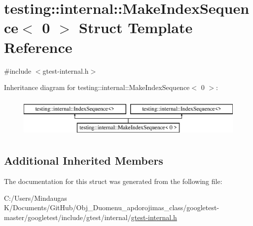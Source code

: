 \hypertarget{structtesting_1_1internal_1_1_make_index_sequence_3_010_01_4}{}\section{testing\+::internal\+::Make\+Index\+Sequence$<$ 0 $>$ Struct Template Reference}
\label{structtesting_1_1internal_1_1_make_index_sequence_3_010_01_4}


{\ttfamily \#include $<$gtest-\/internal.\+h$>$}

Inheritance diagram for testing\+::internal\+::Make\+Index\+Sequence$<$ 0 $>$\+:\begin{figure}[H]
\begin{center}
\leavevmode
\includegraphics[height=2.000000cm]{db/dac/structtesting_1_1internal_1_1_make_index_sequence_3_010_01_4}
\end{center}
\end{figure}
\subsection*{Additional Inherited Members}


The documentation for this struct was generated from the following file\+:\begin{DoxyCompactItemize}
\item 
C\+:/\+Users/\+Mindaugas K/\+Documents/\+Git\+Hub/\+Obj\+\_\+\+Duomenu\+\_\+apdorojimas\+\_\+class/googletest-\/master/googletest/include/gtest/internal/\mbox{\hyperlink{googletest-master_2googletest_2include_2gtest_2internal_2gtest-internal_8h}{gtest-\/internal.\+h}}\end{DoxyCompactItemize}
